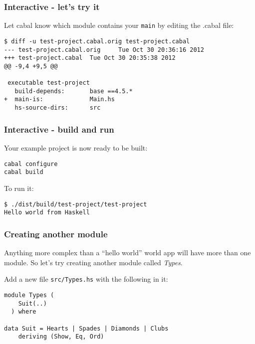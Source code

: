 \documentclass{beamer}
\begin{document}
\begin{frame}[fragile]
\frametitle{Interactive - let's try it}
Let cabal know which module contains your \verb+main+ by editing the .cabal file:

\begin{verbatim}
$ diff -u test-project.cabal.orig test-project.cabal
--- test-project.cabal.orig     Tue Oct 30 20:36:16 2012
+++ test-project.cabal  Tue Oct 30 20:35:38 2012
@@ -9,4 +9,5 @@

 executable test-project
   build-depends:       base ==4.5.*
+  main-is:             Main.hs
   hs-source-dirs:      src
\end{verbatim}

\end{frame}

\begin{frame}[fragile]
\frametitle{Interactive - build and run}

Your example project is now ready to be built:

\begin{verbatim}
cabal configure
cabal build
\end{verbatim}

To run it:
\begin{verbatim}
$ ./dist/build/test-project/test-project
Hello world from Haskell
\end{verbatim}

\end{frame}

\begin{frame}[fragile]
\frametitle{Creating another module}

Anything more complex than a ``hello world'' world app will have more
than one module.  So let's try creating another module called {\em Types}.

\bigskip
Add a new file \verb+src/Types.hs+ with the following in it:

\begin{verbatim}
module Types (
    Suit(..)
  ) where

data Suit = Hearts | Spades | Diamonds | Clubs
    deriving (Show, Eq, Ord)
\end{verbatim}

\end{frame}
\end{document}
